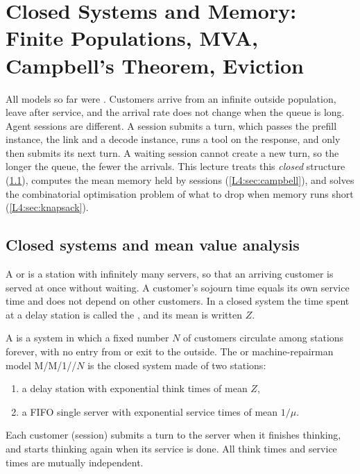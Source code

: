 \chapter{Closed Systems and Memory: Finite Populations, MVA, Campbell's Theorem, Eviction}\label{sec:L4}

All models so far were . Customers arrive from an infinite
outside population, leave after service, and the arrival rate does not change
when the queue is long. Agent sessions are different. A session submits a turn,
which passes the prefill instance, the link and a decode instance, runs a tool on
the response, and only then submits its next turn. A
waiting session cannot create a new turn, so the longer the queue, the fewer the
arrivals. This lecture treats this \emph{closed} structure
(\cref{L4:sec:closed}), computes the mean memory held by sessions
(\cref{L4:sec:campbell}), and solves the combinatorial optimisation problem of
what to drop when memory runs short (\cref{L4:sec:knapsack}).

\section{Closed systems and mean value analysis}\label{L4:sec:closed}

\begin{definition}\label{L4:def:delay}
A  or  is a station with
infinitely many servers, so that an arriving customer is served at once without
waiting. A customer's sojourn time equals its own service time and does not
depend on other customers. In a closed system the time spent at a delay station
is called the , and its mean is written $Z$.
\end{definition}

\begin{definition}\label{L4:def:closed}
A  is a system in which a fixed number $N$ of customers
circulate among stations forever, with no entry from or exit to the outside. The
 or machine-repairman model M/M/1//$N$ is the closed
system made of two stations:
\begin{enumerate}[label=(\alph*)]
\item a delay station with exponential think times of mean $Z$,
\item a FIFO single server with exponential service times of mean $1/\mu$.
\end{enumerate}
Each customer (session) submits a turn to the server when it finishes thinking,
and starts thinking again when its service is done. All think times and service
times are mutually independent.
\end{definition}

